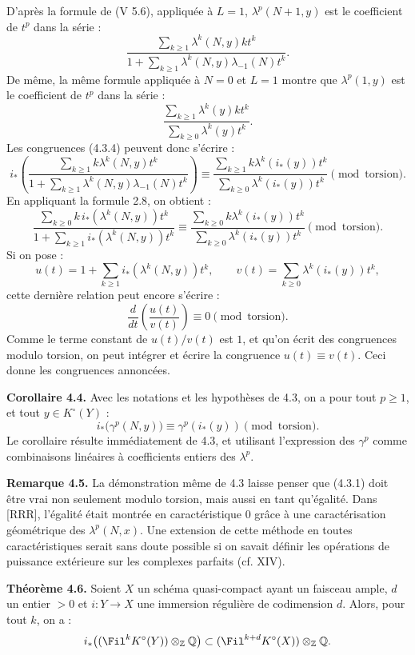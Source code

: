 D'après la formule de (V 5.6), appliquée à \(L=1\), \(\lambda^p(N+1,y)\) est le coefficient de \(t^p\) dans la série :
\[
  \frac{\sum_{k\ge1}\lambda^k(N,y)kt^k}
       {1+\sum_{k\ge1}\lambda^k(N,y)\lambda_{-1}(N)t^k}.
\]
De même, la même formule appliquée à \(N=0\) et \(L=1\) montre que \(\lambda^p(1,y)\) est le coefficient de \(t^p\) dans la série :
\[
  \frac{\sum_{k\ge1}\lambda^k(y)kt^k}
       {\sum_{k\ge0}\lambda^k(y)t^k}.
\]
Les congruences (4.3.4) peuvent donc s'écrire :
\[
i_*\left(
  \frac{\sum_{k\ge1}k\lambda^k(N,y)t^k}
       {1+\sum_{k\ge1}\lambda^k(N,y)\lambda_{-1}(N)t^k}
\right)
\equiv
  \frac{\sum_{k\ge1}k\lambda^k(i_*(y))t^k}
       {\sum_{k\ge0}\lambda^k(i_*(y))t^k}
       \pmod{\text{torsion}}.
\]
En
appliquant la formule 2.8, on obtient :
\[
  \frac{\sum_{k\ge0}k\,i_*(\lambda^k(N,y))t^k}
       {1+\sum_{k\ge1} i_*(\lambda^k(N,y))t^k}
  \equiv
  \frac{\sum_{k\ge0}k\lambda^k(i_*(y))t^k}
       {\sum_{k\ge0}\lambda^k(i_*(y))t^k}
       \pmod{\text{torsion}}.
\]
Si on pose :
\[
  u(t)=1+\sum_{k\ge1}i_*(\lambda^k(N,y))t^k,\qquad
  v(t)=\sum_{k\ge0}\lambda^k(i_*(y))t^k,
\]
cette dernière relation peut encore s'écrire :
\[
  \frac{d}{dt}\!\left(\frac{u(t)}{v(t)}\right)\equiv0
  \pmod{\text{torsion}}.
\]
Comme le terme constant de \(u(t)/v(t)\) est \(1\), et qu'on écrit des congruences modulo torsion, on peut intégrer et écrire la congruence \(u(t)\equiv v(t)\). Ceci donne les congruences annoncées.

\textbf{Corollaire 4.4.} Avec les notations et les hypothèses de 4.3, on a pour tout \(p\ge1\), et tout \(y\in K^\circ(Y)\) :
\[
  i_*\bigl(\gamma^p(N,y)\bigr)\equiv \gamma^p(i_*(y))
  \pmod{\text{torsion}}.
\]
Le corollaire résulte immédiatement de 4.3, et utilisant l'expression des \(\gamma^p\) comme combinaisons linéaires à coefficients entiers des \(\lambda^p\).

\textbf{Remarque 4.5.} La démonstration même de 4.3 laisse penser que (4.3.1) doit être vrai non seulement modulo torsion, mais aussi en tant qu'égalité. Dans [RRR], l'égalité était montrée en caractéristique \(0\) grâce à une caractérisation géométrique des \(\lambda^p(N,x)\). Une extension de cette méthode en toutes caractéristiques serait sans doute possible si on savait définir les opérations de puissance extérieure sur les complexes parfaits (cf. XIV).

\textbf{Théorème 4.6.}
Soient \(X\) un schéma quasi-compact ayant un faisceau ample, \(d\) un entier \(>0\) et \(i:Y\to X\) une immersion régulière de codimension \(d\). Alors, pour tout \(k\), on a :
\[
 i_*\bigl((\Fil^kK^\circ(Y))\otimes_{\mathbb Z}\mathbb Q\bigr)
 \subset
 (\Fil^{k+d}K^\circ(X))\otimes_{\mathbb Z}\mathbb Q.
\]

